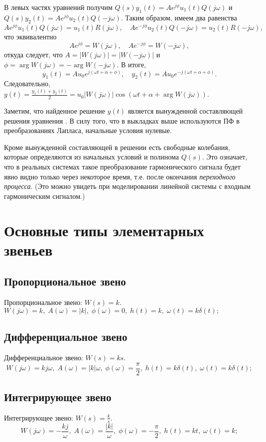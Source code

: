 \documentclass[../../TAU.tex]{subfiles}
\begin{document}
    В левых частях уравнений получим $Q(s)y_1(t) = Ae^{j\phi}u_1(t)Q(j\omega)$ и $Q(s)y_2(t) = Ae^{j\phi}u_2(t)Q(-j\omega)$. Таким образом, имеем два равенства
    $$
        Ae^{j\phi} u_1(t)Q(j\omega) = u_1(t)R(j\omega),\quad Ae^{-j\phi} u_2(t)Q(-j\omega) = u_2(t)R(-j\omega),
    $$
    что эквивалентно
    $$
        Ae^{j\phi} = W(j\omega),\quad Ae^{-j\phi} = W(-j\omega),
    $$
    откуда следует, что 
    $A = |W(j\omega)| = |W(-j\omega)|$ и 
    $\phi = \arg W(j\omega) = -\arg W(-j\omega)$. В итоге,
    $$
        y_1(t) = Au_0e^{j(\omega t + \alpha + \phi)},\quad
        y_2(t) = Au_0e^{-j(\omega t + \alpha + \phi)}.
    $$
    Следовательно, $y(t) = \frac{y_1(t)+y_2(t)}{2} = u_0|W(j\omega)| \cos(\omega t + \alpha + \arg W(j\omega))$.

    Заметим, что найденное решение $y(t)$ является вынужденной составляющей решения уравнения .  В силу того, что в выкладках выше используются ПФ в преобразованиях Лапласа, начальные условия нулевые.

    Кроме вынужденной составляющей в решении есть свободные колебания, которые определяются из начальных условий и полинома $Q(s)$. Это означает, что в реальных системах такое преобразование гармонического сигнала будет явно видно только через некоторое время, т.е. после окончания {\it переходного процесса}. (Это можно увидеть при моделировании линейной системы с входным гармоническим сигналом.)
\section{Основные типы элементарных звеньев} %

\subsection{Пропорциональное звено} %
    Пропорциональное звено: $W(s)=k$.  
    $W(j\omega) = k,\; A(\omega) = |k|,\; \phi(\omega) = 0,\; h(t) = k,\; \omega(t) = k\delta(t);$
\subsection{Дифференциальное звено} %
    Дифференциальное звено: $W(s) = ks$.
    $$
        W(j\omega) = kj\omega,\; A(\omega) = |k|\omega, \; \phi(\omega) = \frac{\pi}{2},\; h(t) = k\delta(t),\; \omega(t) = k\dot\delta(t);
    $$
\subsection{Интегрирующее звено} %
    Интегрирующее звено: $W(s) = \frac{k}{s}$.
    $$
        W(j\omega) = -\frac{k j}{\omega},\; A(\omega) = \frac{|k|}{\omega},\; \phi(\omega) = -\frac{\pi}{2},\; h(t) = kt,\; \omega(t) = k;
    $$
\end{document}
